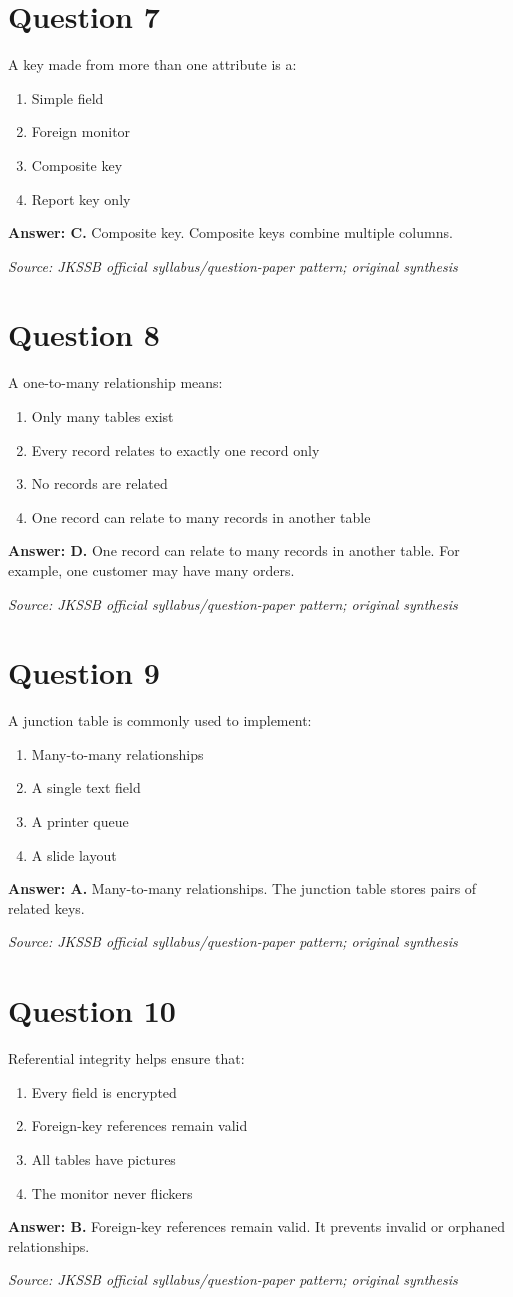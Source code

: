 \documentclass[11pt,a4paper]{book}
\newcommand{\source}[1]{\par\smallskip\textit{Source: #1}}
\newcommand{\answer}[2]{\par\textbf{Answer: #1.} #2}
\begin{document}
\section*{Question 7}
A key made from more than one attribute is a:
\begin{enumerate}[label=\Alph*.]
\item Simple field
\item Foreign monitor
\item Composite key
\item Report key only
\end{enumerate}
\answer{C}{Composite key. Composite keys combine multiple columns.}
\source{JKSSB official syllabus/question-paper pattern; original synthesis}
\section*{Question 8}
A one-to-many relationship means:
\begin{enumerate}[label=\Alph*.]
\item Only many tables exist
\item Every record relates to exactly one record only
\item No records are related
\item One record can relate to many records in another table
\end{enumerate}
\answer{D}{One record can relate to many records in another table. For example, one customer may have many orders.}
\source{JKSSB official syllabus/question-paper pattern; original synthesis}
\section*{Question 9}
A junction table is commonly used to implement:
\begin{enumerate}[label=\Alph*.]
\item Many-to-many relationships
\item A single text field
\item A printer queue
\item A slide layout
\end{enumerate}
\answer{A}{Many-to-many relationships. The junction table stores pairs of related keys.}
\source{JKSSB official syllabus/question-paper pattern; original synthesis}
\section*{Question 10}
Referential integrity helps ensure that:
\begin{enumerate}[label=\Alph*.]
\item Every field is encrypted
\item Foreign-key references remain valid
\item All tables have pictures
\item The monitor never flickers
\end{enumerate}
\answer{B}{Foreign-key references remain valid. It prevents invalid or orphaned relationships.}
\source{JKSSB official syllabus/question-paper pattern; original synthesis}
\end{document}
